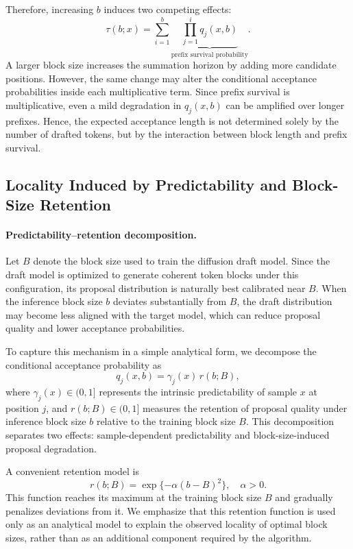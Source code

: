 \documentclass{article}
\begin{document}
Therefore, increasing $b$ induces two competing effects:
\begin{equation}
\tau(b;x)
=
\sum_{i=1}^{b}
\underbrace{
\prod_{j=1}^{i}
q_j(x,b)
}_{\text{prefix survival probability}}.
\end{equation}
A larger block size increases the summation horizon by adding more candidate positions. However, the same change may alter the conditional acceptance probabilities inside each multiplicative term. Since prefix survival is multiplicative, even a mild degradation in $q_j(x,b)$ can be amplified over longer prefixes. Hence, the expected acceptance length is not determined solely by the number of drafted tokens, but by the interaction between block length and prefix survival.

\subsection{Locality Induced by Predictability and Block-Size Retention}

\paragraph{Predictability--retention decomposition.}
Let $B$ denote the block size used to train the diffusion draft model. Since the draft model is optimized to generate coherent token blocks under this configuration, its proposal distribution is naturally best calibrated near $B$. When the inference block size $b$ deviates substantially from $B$, the draft distribution may become less aligned with the target model, which can reduce proposal quality and lower acceptance probabilities.

To capture this mechanism in a simple analytical form, we decompose the conditional acceptance probability as
\begin{equation}
q_j(x,b)
=
\gamma_j(x)\, r(b;B),
\end{equation}
where $\gamma_j(x)\in(0,1]$ represents the intrinsic predictability of sample $x$ at position $j$, and $r(b;B)\in(0,1]$ measures the retention of proposal quality under inference block size $b$ relative to the training block size $B$. This decomposition separates two effects: sample-dependent predictability and block-size-induced proposal degradation.

A convenient retention model is
\begin{equation}
r(b;B)
=
\exp\{-\alpha(b-B)^2\},
\quad
\alpha>0.
\end{equation}
This function reaches its maximum at the training block size $B$ and gradually penalizes deviations from it. We emphasize that this retention function is used only as an analytical model to explain the observed locality of optimal block sizes, rather than as an additional component required by the algorithm.
\end{document}
